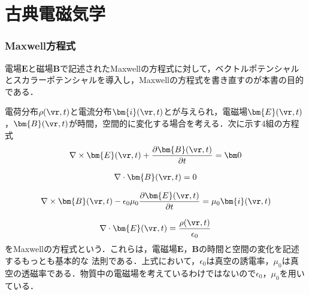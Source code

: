 \part{古典電磁気学}
\section{Maxwell方程式}
電場$\bm{E}$と磁場$\bm{B}$で記述されたMaxwellの方程式に対して，ベクトルポテンシャルとスカラーポテンシャルを導入し，Maxwellの方程式を書き直すのが本書の目的である．

電荷分布$\rho(\vr,t)$と電流分布${\bm{i}}(\vr,t)$とが与えられ，電磁場$\bm{E}(\vr,t)$，$\bm{B}(\vr,t)$が時間，空間的に変化する場合を考える．次に示す4組の方程式
\begin{align}
\label{mx1}
\nabla\times\bm{E}(\vr,t)+\dfrac{\partial\bm{B}(\vr,t)}{\partial t}=\bm 0
\end{align}

\begin{align}
\label{mx2}
\nabla\cdot\bm{B}(\vr,t)=0
\end{align}

\begin{align}
\label{mx3}
   \nabla\times\bm{B}(\vr,t)-\epsilon_0\mu_0\dfrac{\partial\bm{E}(\vr,t)}{\partial t}
      =\mu_0{\bm{i}}(\vr,t)
\end{align}

\begin{align}
\label{mx4}
   \nabla\cdot\bm{E}(\vr,t)
      =\frac{\rho(\vr,t)}{\epsilon_0}
\end{align}
をMaxwellの方程式という．これらは，電磁場$\bm{E}$，$\bm{B}$の時間と空間の変化を記述するもっとも基本的な
法則である．上式において，$\epsilon_0$は真空の誘電率，$\mu_0$は真空の透磁率である．物質中の電磁場を考えているわけではないので$\epsilon_0$，$\mu_0$を用いている．\\





%
